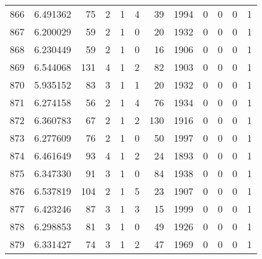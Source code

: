 \begin{tabular}{lrrrrrrrrrrr}
866 &  6.491362 &   75 &      2 &        1 &      4 &              39 &  1994 &               0 &               0 &               0 &               1 \\
867 &  6.200029 &   59 &      2 &        1 &      0 &              20 &  1932 &               0 &               0 &               0 &               1 \\
868 &  6.230449 &   59 &      2 &        1 &      0 &              16 &  1906 &               0 &               0 &               0 &               1 \\
869 &  6.544068 &  131 &      4 &        1 &      2 &              82 &  1903 &               0 &               0 &               0 &               1 \\
870 &  5.935152 &   83 &      3 &        1 &      1 &              20 &  1932 &               0 &               0 &               0 &               1 \\
871 &  6.274158 &   56 &      2 &        1 &      4 &              76 &  1934 &               0 &               0 &               0 &               1 \\
872 &  6.360783 &   67 &      2 &        1 &      2 &             130 &  1916 &               0 &               0 &               0 &               1 \\
873 &  6.277609 &   76 &      2 &        1 &      0 &              50 &  1997 &               0 &               0 &               0 &               1 \\
874 &  6.461649 &   93 &      4 &        1 &      2 &              24 &  1893 &               0 &               0 &               0 &               1 \\
875 &  6.347330 &   91 &      3 &        1 &      0 &              84 &  1938 &               0 &               0 &               0 &               1 \\
876 &  6.537819 &  104 &      2 &        1 &      5 &              23 &  1907 &               0 &               0 &               0 &               1 \\
877 &  6.423246 &   87 &      3 &        1 &      3 &              15 &  1999 &               0 &               0 &               0 &               1 \\
878 &  6.298853 &   81 &      3 &        1 &      0 &              49 &  1926 &               0 &               0 &               0 &               1 \\
879 &  6.331427 &   74 &      3 &        1 &      2 &              47 &  1969 &               0 &               0 &               0 &               1 \\

\end{tabular}
